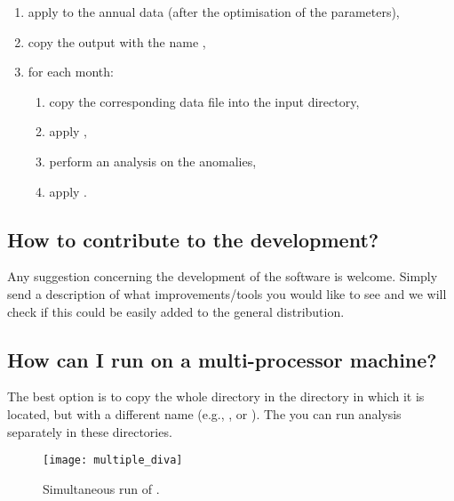 \begin{enumerate} 
\item apply  to the annual data (after the optimisation of the parameters),
\item copy the output  with the name ,
\item for each month:
\begin{enumerate}
\item copy the corresponding data file into the input directory,
\item apply ,
\item perform an analysis on the anomalies,
\item apply .
\end{enumerate}									 
\end{enumerate}
									 
%
%

\subsection{How to contribute to the development?}

Any suggestion concerning the development of the software is welcome. Simply send a description of what improvements/tools you would like to see and we will check if this could be easily added to the general distribution.


\subsection{How can I run \diva on a multi-processor machine?}

The best option is to copy the whole directory  in the directory in which it is located, but with a different name (e.g.,  , or ). The you can run \diva analysis separately in these directories. 


\begin{figure}[htpb]
\centering
\texttt{[image: multiple\_diva]}
\caption{Simultaneous run of \diva.}
\end{figure}



